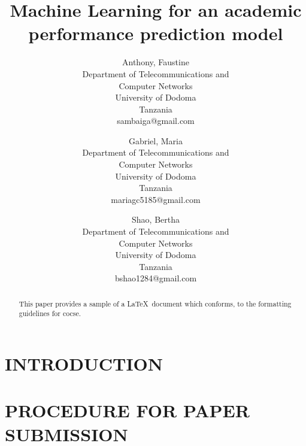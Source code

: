 \documentclass{cocseArticle}
\begin{document}
\title{Machine Learning for an academic performance prediction model} %

\author{ 
   \large Anthony, Faustine \\[-3pt]
   \normalsize Department of Telecommunications and \\ Computer Networks
  \\[-3pt]
    \normalsize University of Dodoma \\[-3pt]
    \normalsize Tanzania \\[-3pt]
    \normalsize	sambaiga@gmail.com \\[-3pt]
  \and
   \large Gabriel, Maria \\[-3pt]
   \normalsize Department of Telecommunications and \\ Computer Networks  \\[-3pt]
    \normalsize University of Dodoma \\[-3pt]
    \normalsize Tanzania \\[-3pt]
    \normalsize	mariagc5185@gmail.com \\[-3pt]
\and
   \large Shao, Bertha \\[-3pt]
   \normalsize Department of Telecommunications and \\ Computer Networks  \\[-3pt]
    \normalsize University of Dodoma \\[-3pt]
    \normalsize Tanzania \\[-3pt]
    \normalsize	bshao1284@gmail.com \\[-3pt]
}


\maketitle



\begin{abstract} 
This paper provides a sample of a \LaTeX\ document which conforms,
to the formatting guidelines for cocse. 
\end{abstract}

\section{INTRODUCTION}

\section{PROCEDURE FOR PAPER SUBMISSION}
\end{document}
